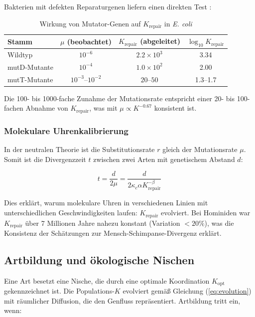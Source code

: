 \documentclass[12pt,a4paper]{article}
\theoremstyle{remark}
\newcommand{\Keffopt}{K_{\mathrm{opt}}}
\newcommand{\kappac}{\kappa_c}
\begin{document}
	Bakterien mit defekten Reparaturgenen liefern einen direkten Test \cite{Drake1991}:
	
	\begin{table}[htbp]
		\centering
		\caption{Wirkung von Mutator-Genen auf $K_{\text{repair}}$ in \textit{E. coli} \cite{Drake1991}}
		\label{tab:mutators}
		\small
		\begin{tabular}{lccc}
			\toprule
			\textbf{Stamm} & $\mu$ (beobachtet) & $K_{\text{repair}}$ (abgeleitet) & $\log_{10} K_{\text{repair}}$ \\
			\midrule
			Wildtyp & $10^{-6}$ & $2.2 \times 10^3$ & 3.34 \\
			mutD-Mutante & $10^{-4}$ & $1.0 \times 10^2$ & 2.00 \\
			mutT-Mutante & $10^{-3}$--$10^{-2}$ & $20$--$50$ & 1.3--1.7 \\
			\bottomrule
		\end{tabular}
	\end{table}
	
	Die 100- bis 1000-fache Zunahme der Mutationsrate entspricht einer 20- bis 100-fachen Abnahme von $K_{\text{repair}}$, was mit $\mu \propto K^{-0.67}$ konsistent ist.
	
	\subsubsection{Molekulare Uhrenkalibrierung}
	
	In der neutralen Theorie ist die Substitutionsrate $r$ gleich der Mutationsrate $\mu$. Somit ist die Divergenzzeit $t$ zwischen zwei Arten mit genetischem Abstand $d$:
	
	\begin{equation}
		t = \frac{d}{2\mu} = \frac{d}{2\kappac \alpha K_{\text{repair}}^{-\beta}}
		\label{eq:molecular-clock}
	\end{equation}
	
	Dies erklärt, warum molekulare Uhren in verschiedenen Linien mit unterschiedlichen Geschwindigkeiten laufen: $K_{\text{repair}}$ evolviert. Bei Hominiden war $K_{\text{repair}}$ über 7 Millionen Jahre nahezu konstant (Variation $<20\%$), was die Konsistenz der Schätzungen zur Mensch-Schimpanse-Divergenz erklärt.
	
	\subsection{Artbildung und ökologische Nischen}
	
	Eine Art besetzt eine Nische, die durch eine optimale Koordination $\Keffopt$ gekennzeichnet ist. Die Populations-$K$ evolviert gemäß Gleichung (\ref{eq:evolution}) mit räumlicher Diffusion, die den Genfluss repräsentiert. Artbildung tritt ein, wenn:
	
\end{document}

